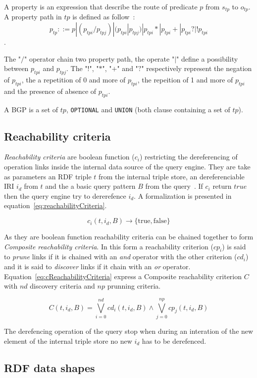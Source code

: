 \begin{definition}\label{def:propertyPath}
   A property is an expression that describe the route of predicate $p$ from $s_{tp}$ to $o_{tp}$.
   A property path in $tp$ is defined as follow~:
   $$p_{tp} ::= p | (p_{tpi}/p_{tpj}) | (p_{tpi}|p_{tpj}) | p_{tpi}* | p_{tpi}+ | p_{tpi}? | !p_{tpi}$$.

   The "$/$" operator chain two property path, the operate "$|$" define a possibility between $p_{tpi}$ and $p_{tpj}$.
   The "$!$", "$*$", "$+$" and "$?$" respectively represent the negation of $p_{tpi}$, the a repetition of 0 and more of $p_{tpi}$, 
   the repeition of 1 and more of $p_{tpi}$ and the presence of absence of $p_{tpi}$.
\end{definition}

\begin{definition}[BGP]\label{def:propertyPath}
 A BGP is a set of $tp$, \texttt{OPTIONAL} and \texttt{UNION} (both clause containing a set of $tp$).
\end{definition}


\subsection{Reachability criteria}

\emph{Reachability criteria} are boolean function ($c_i$) restricting the dereferencing of operation links inside the internal data source of the query engine.
They are take as parameters an RDF triple $t$ from the internal triple store, an dereferenciable IRI $i_d$ from $t$ and the a basic query pattern $B$ from the query~\cite{Hartig2012}.
If $c_i$ return $true$ then the query engine try to dererefence $i_d$.
A formalization is presented in equation~\ref{eq:reachabilityCriteria}.


\begin{equation}\label{eq:reachabilityCriteria}
c_i(t, i_d, B) \rightarrow \{\mathrm{true}, \mathrm{false}\}
\end{equation}

As they are boolean function reachability criteria can be chained together to form \emph{Composite reachability criteria}.
In this form a reachability criterion ($cp_i$) is said to \emph{prune} links if it is chained with an \emph{and} operator with the other criterion ($cd_i$) and it is said to \emph{discover} links if it chain with an \emph{or} operator.
Equation~\ref{eq:cReachabilityCriteria} express a Composite reachability criterion $C$ with $nd$ discovery criteria and $np$ prunning criteria.

\begin{equation}\label{eq:cReachabilityCriteria}
    C(t, i_d, B)  = \bigvee_{i=0}^{nd}cd_i(t, i_d, B) \land \bigvee_{j=0}^{np}cp_j(t, i_d, B)
\end{equation}

The derefencing operation of the query stop when during an interation of the new element of the internal triple store no new $i_d$ has to be derefenced.

\subsection{RDF data shapes}